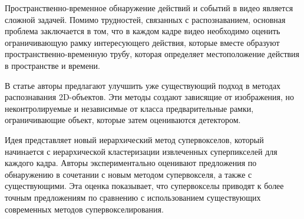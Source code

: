Пространственно-временное обнаружение действий и событий в видео является сложной задачей. Помимо трудностей, связанных с распознаванием, основная проблема заключается в том, что в каждом кадре видео необходимо 
оценить ограничивающую рамку интересующего действия, которые вместе образуют пространственно-временную трубу, которая определяет местоположение действия в пространстве и времени.





В статье \cite{time1} авторы предлагают улучшить уже существующий подход в методах распознавания 2D-объектов. Эти методы создают зависящие от изображения, но неконтролируемые и независимые от класса предварительные
рамки, ограничивающие объект, которые затем оцениваются детектором.

Идея представляет новый иерархический
метод супервокселов, который начинается с иерархической кластеризации извлеченных суперпикселей для каждого кадра. Авторы экспериментально оценивают предложения по обнаружению в сочетании с 
новым методом супервокселя, а также с существующими. Эта оценка показывает, что супервокселы приводят к более точным предложениям по сравнению с использованием существующих современных
методов супервокселирования.

